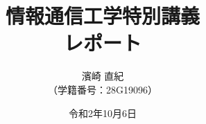 \documentclass[a4paper]{jsarticle}
\title{\Huge 情報通信工学特別講義\\\huge レポート\vspace{120mm}}
\author{\Large 濱崎 直紀\\\large （学籍番号：28G19096）\vspace{25mm}}
\date{令和2年10月6日}
\begin{document}
\begin{titlepage}
\maketitle
\thispagestyle{empty}
\end{titlepage}



\end{document}
